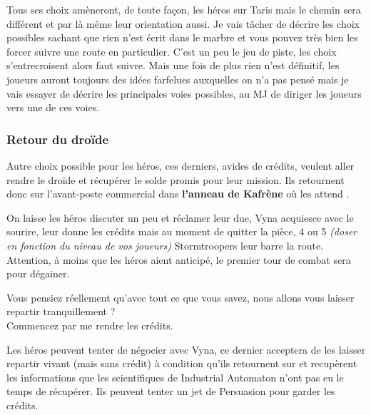 Tous ses choix amèneront, de toute façon, les héros sur Taris mais le chemin sera différent et par là même leur orientation aussi. Je vais tâcher de décrire les choix possibles sachant que rien n’est écrit dans le marbre et vous pouvez très bien les forcer suivre une route en particulier. C’est un peu le jeu de piste, les choix s’entrecroisent alors faut suivre. Mais une fois de plus rien n’est définitif, les joueurs auront toujours des idées farfelues auxquelles on n’a pas pensé mais je vais essayer de décrire les principales voies possibles, au MJ de diriger les joueurs vers une de ces voies.


\subsubsection{Retour du droïde} \label{sec:retour-du-droide}

Autre choix possible pour les héros, ces derniers, avides de crédits, veulent aller rendre le droïde et récupérer le solde promis pour leur mission. Ils retournent donc sur l’avant-poste commercial dans \textbf{l’anneau de Kafrène} où les attend .

On laisse les héros discuter un peu et réclamer leur due, Vyna acquiesce avec le sourire, leur donne les crédits mais au moment de quitter la pièce, 4 ou 5 \textit{(doser en fonction du niveau de vos joueurs)} Stormtroopers leur barre la route. Attention, à moins que les héros aient anticipé, le premier tour de combat sera pour dégainer.

\begin{quotebox}
    Vous pensiez réellement qu’avec tout ce que vous savez, nous allons vous laisser repartir tranquillement ?\\
    Commencez par me rendre les crédits.
\end{quotebox}

Les héros peuvent tenter de négocier avec Vyna, ce dernier acceptera de les laisser repartir vivant (mais sans crédit) à condition qu’ils retournent sur  et recupèrent les informations que les scientifiques de Industrial Automaton n’ont pas eu le temps de récupérer. Ils peuvent tenter un jet de Persuasion pour garder les crédits.\\

